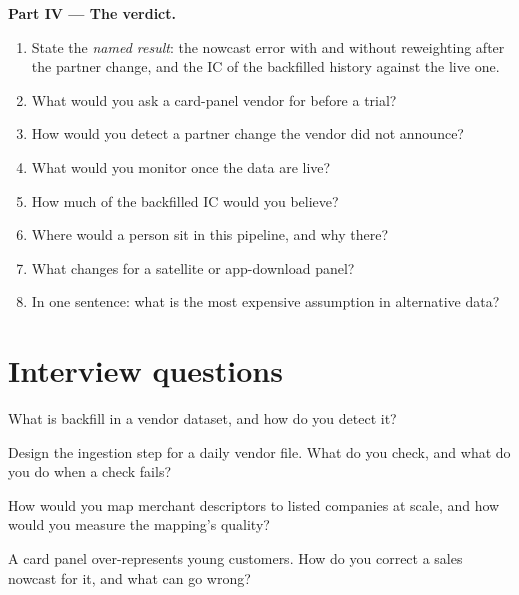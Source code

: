 \begin{problem}
\medskip\noindent\textbf{Part IV --- The verdict.}
\begin{enumerate}[resume]
\item State the \emph{named result}: the nowcast error with and without reweighting after the partner change, and the IC of
the backfilled history against the live one.
\item What would you ask a card-panel vendor for before a trial?
\item How would you detect a partner change the vendor did not announce?
\item What would you monitor once the data are live?
\item How much of the backfilled IC would you believe?
\item Where would a person sit in this pipeline, and why there?
\item What changes for a satellite or app-download panel?
\item In one sentence: what is the most expensive assumption in alternative data?
\end{enumerate}
\end{problem}

\section{Interview questions}

\begin{interviewq}\label{iq:ml:alternative-data-pipelines:1}
What is backfill in a vendor dataset, and how do you detect it?
\end{interviewq}

\begin{interviewq}\label{iq:ml:alternative-data-pipelines:2}
Design the ingestion step for a daily vendor file. What do you check, and what do you do when a check fails?
\end{interviewq}

\begin{interviewq}\label{iq:ml:alternative-data-pipelines:3}
How would you map merchant descriptors to listed companies at scale, and how would you measure the mapping's quality?
\end{interviewq}

\begin{interviewq}\label{iq:ml:alternative-data-pipelines:4}
A card panel over-represents young customers. How do you correct a sales nowcast for it, and what can go wrong?
\end{interviewq}


